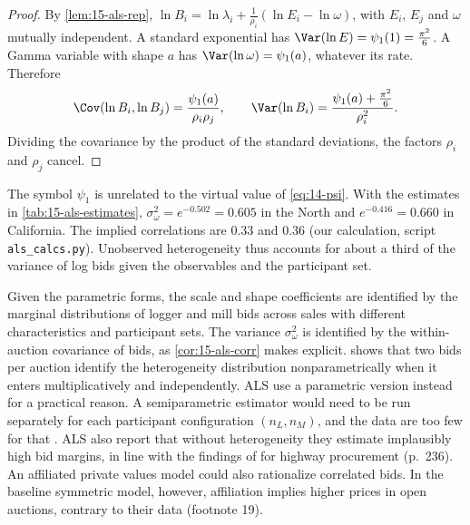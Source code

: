 \begin{proof}
By \cref{lem:15-als-rep}, $\ln B_i=\ln\lambda_i+\frac{1}{\rho_i}(\ln E_i-\ln\omega)$, with $E_i$, $E_j$ and
$\omega$ mutually independent. A standard exponential has $\Var(\ln E)=\psi_1(1)=\frac{\pi^2}{6}$. A Gamma
variable with shape $a$ has $\Var(\ln\omega)=\psi_1(a)$, whatever its rate. Therefore
\[
\Cov(\ln B_i,\ln B_j)=\frac{\psi_1(a)}{\rho_i\rho_j},\qquad
\Var(\ln B_i)=\frac{\psi_1(a)+\frac{\pi^2}{6}}{\rho_i^2}.
\]
Dividing the covariance by the product of the standard deviations, the factors $\rho_i$ and $\rho_j$
cancel.
\end{proof}

The symbol $\psi_1$ is unrelated to the virtual value of \eqref{eq:14-psi}. With the estimates in
\cref{tab:15-als-estimates}, $\sigma^2_\omega=e^{-0.502}=0.605$ in the North and $e^{-0.416}=0.660$ in
California. The implied correlations are 0.33 and 0.36 (our calculation, script
\texttt{als\_calcs.py}). Unobserved heterogeneity thus accounts for about a third of the variance of log
bids given the observables and the participant set.

Given the parametric forms, the scale and shape coefficients are identified by the marginal distributions
of logger and mill bids across sales with different characteristics and participant sets. The variance
$\sigma^2_\omega$ is identified by the within-auction covariance of bids, as \cref{cor:15-als-corr} makes
explicit.  shows that two bids per auction identify the heterogeneity distribution
nonparametrically when it enters multiplicatively and independently. ALS use a parametric version instead
for a practical reason. A semiparametric estimator would need to be run separately for each participant
configuration $(n_L,n_M)$, and the data are too few for that \citep[footnote 22]{AtheyLevinSeira2011}.
ALS also report that without heterogeneity they estimate implausibly high bid margins, in line with the
findings of \citet{Krasnokutskaya2011} for highway procurement (p.~236). An affiliated private values
model could also rationalize correlated bids. In the baseline symmetric model, however, affiliation
implies higher prices in open auctions, contrary to their data (footnote 19).

